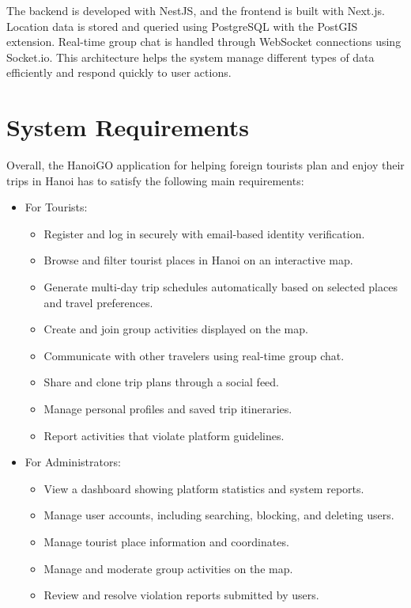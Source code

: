 \documentclass[a4paper,12pt]{report}
\begin{document}
The backend is developed with NestJS, and the frontend is built with Next.js. Location data is stored and queried using PostgreSQL with the PostGIS extension. Real-time group chat is handled through WebSocket connections using Socket.io. This architecture helps the system manage different types of data efficiently and respond quickly to user actions.

\section{System Requirements}

Overall, the HanoiGO application for helping foreign tourists plan and enjoy their trips in Hanoi has to satisfy the following main requirements:
 
\begin{itemize}
    \item For Tourists:
    \begin{itemize}
        \item Register and log in securely with email-based identity verification.
        \item Browse and filter tourist places in Hanoi on an interactive map.
        \item Generate multi-day trip schedules automatically based on selected places and travel preferences.
        \item Create and join group activities displayed on the map.
        \item Communicate with other travelers using real-time group chat.
        \item Share and clone trip plans through a social feed.
        \item Manage personal profiles and saved trip itineraries.
        \item Report activities that violate platform guidelines.
    \end{itemize}
 
    \item For Administrators:
    \begin{itemize}
        \item View a dashboard showing platform statistics and system reports.
        \item Manage user accounts, including searching, blocking, and deleting users.
        \item Manage tourist place information and coordinates.
        \item Manage and moderate group activities on the map.
        \item Review and resolve violation reports submitted by users.
    \end{itemize}
\end{itemize}
\end{document}
